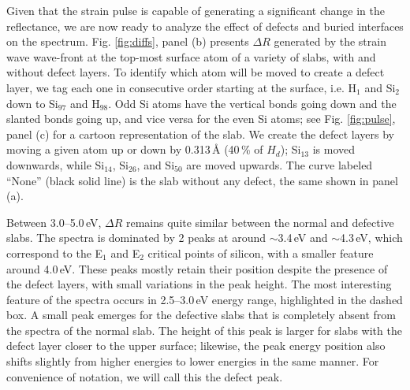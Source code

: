 \documentclass[aps,prb,10pt,showkeys,letterpaper,notitlepage,twocolumn]{revtex4-1}
\begin{document}
Given that the strain pulse is capable of generating a significant change in the
reflectance, we are now ready to analyze the effect of defects and buried
interfaces on the spectrum. Fig. \ref{fig:diffs}, panel (b) presents $\Delta R$
generated by the strain wave wave-front at the top-most surface atom of a
variety of slabs, with and without defect layers. To identify which atom will be
moved to create a defect layer, we tag each one in consecutive order starting at
the surface, i.e. H$_{1}$ and Si$_{2}$ down to Si$_{97}$ and H$_{98}$. Odd Si
atoms have the vertical bonds going down and the slanted bonds going up, and
vice versa for the even Si atoms; see Fig. \ref{fig:pulse}, panel (c) for a
cartoon representation of the slab. We create the defect layers by moving a
given atom up or down by 0.313\,\r{A} (40\,\% of $H_{d}$); Si$_{13}$ is moved
downwards, while Si$_{14}$, Si$_{26}$, and Si$_{50}$ are moved upwards. The
curve labeled ``None'' (black solid line) is the slab without any defect, the
same shown in panel (a).

Between 3.0--5.0\,eV, $\Delta R$ remains quite similar between the normal and
defective slabs. The spectra is dominated by 2 peaks at around $\sim$3.4\,eV and
$\sim$4.3\,eV, which correspond to the E$_{1}$ and E$_{2}$ critical points of
silicon, with a smaller feature around 4.0\,eV. These peaks mostly retain their
position despite the presence of the defect layers, with small variations in the
peak height. The most interesting feature of the spectra occurs in 2.5--3.0\,eV
energy range, highlighted in the dashed box. A small peak emerges for the
defective slabs that is completely absent from the spectra of the normal slab.
The height of this peak is larger for slabs with the defect layer closer to the
upper surface; likewise, the peak energy position also shifts slightly from
higher energies to lower energies in the same manner. For convenience of
notation, we will call this the defect peak.
\end{document}
